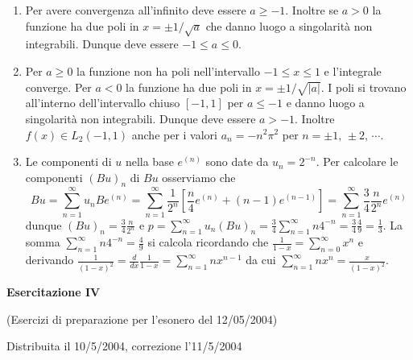 \documentclass[a4paper,10pt]{article}
\begin{document}
\begin{enumerate}
\item Per avere convergenza all'infinito deve essere $a \geq -1$. Inoltre se $a >0$ la funzione ha due
poli in $x=\pm 1/\sqrt{a}$ che danno luogo a singolarit\`a non integrabili. Dunque deve essere
$-1\leq a \leq0$.
\item Per $a\geq 0$ la funzione non ha poli nell'intervallo $-1\leq x \leq1$ e l'integrale converge.
Per $a<0$ la funzione ha due poli in $x=\pm 1/\sqrt{|a|}$. I poli si trovano all'interno dell'intervallo
chiuso $[-1,1]$ per $a \leq -1$ e danno luogo a singolarit\`a non integrabili.  Dunque deve essere $a>-1$. Inoltre $f(x) \in L_2(-1,1)$ anche per i valori $a_n=-n^2 \pi^2$ per $n=\pm1,\, \pm2,\,\cdots$.
\item Le componenti di $u$ nella base $e^{(n)}$ sono date da $u_n = 2^{-n}$. Per calcolare le componenti $(Bu)_n$
di $Bu$ osserviamo che
\begin{equation}\nonumber
Bu = \sum_{n=1}^\infty u_n Be^{(n)} = \sum_{n=1}^\infty \frac1{2^n} \left[ \frac{n}{4} e^{(n)}
+ (n-1) e^{(n-1)} \right] =  \sum_{n=1}^\infty \frac34 \frac{n}{2^n} e^{(n)}
\end{equation}
dunque $(Bu)_n = \frac34  \frac{n}{2^n}$ e $p=\sum_{n=1}^\infty u_n (Bu)_n =
\frac34 \sum_{n=1}^\infty n 4^{-n}=\frac34 \frac49 = \frac13$. La somma
$\sum_{n=1}^\infty n 4^{-n} = \frac49$ si calcola ricordando che $\frac1{1-x}= \sum_{n=0}^\infty x^n$
e derivando $\frac{1}{(1-x)^2}=\frac{d}{dx}\frac1{1-x}= \sum_{n=1}^\infty n x^{n-1}$ da cui $\sum_{n=1}^{\infty}nx^n = \frac{x}{(1-x)^2}$.
\end{enumerate}






\newpage



\centerline{\LARGE \bf Esercitazione IV}
\centerline{(Esercizi di preparazione per l'esonero del 12/05/2004)}
\centerline{Distribuita il 10/5/2004, correzione l'11/5/2004}
\vskip10pt
\end{document}
